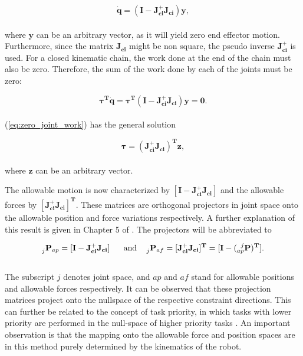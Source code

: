 \begin{equation}
    \mathbf{\dot{q} = (I - J_{ci}^+ J_{ci}) y},
\end{equation}
\\
where $\mathbf{y}$ can be an arbitrary vector, as it will yield zero end effector motion. Furthermore, since the matrix $\mathbf{J_{ci}}$ might be non square, the pseudo inverse $\mathbf{J_{ci}^+}$ is used.
For a closed kinematic chain, the work done at the end of the chain must also be zero. Therefore, the sum of the work done by each of the joints must be zero:

\begin{equation} \label{eq:zero_joint_work}
    \boldsymbol{\tau^T} \mathbf{\dot{q}} = \boldsymbol{\tau^T} \mathbf{(I - J_{ci}^+ J_{ci}) y = 0}.
\end{equation}
\\
(\ref{eq:zero_joint_work}) has the general solution

\begin{equation}
   \boldsymbol{\tau}  \mathbf{= (J_{ci}^+ J_{ci})^T z},
\end{equation}
\\
where $\mathbf{z}$ can be an arbitrary vector.

The allowable motion is now characterized by $\mathbf{[I - J_{ci}^+ J_{ci}]}$ and the allowable forces by $\mathbf{[J_{ci}^+ J_{ci}]^T}$. These matrices are orthogonal projectors in joint space onto the allowable position and force variations respectively. A further explanation of this result is given in Chapter 5 of \cite{west1985method}. The projectors will be abbreviated to

\begin{equation}\label{eq:proj_mtrices}
    \prescript{}{j}{\mathbf{P}}_{ap} = \mathbf{[I - J_{ci}^+ J_{ci}]} \ \ \quad \textrm{and} \quad
    \prescript{}{j}{\mathbf{P}}_{af} = \mathbf{[J_{ci}^+ J_{ci}]^T = [I - (\prescript{j}{ap}{P})^T]}.
\end{equation}
\\
The subscript $j$ denotes joint space, and $ap$ and $af$ stand for allowable positions and allowable forces respectively. It can be observed that these projection matrices project onto the nullspace of the respective constraint directions. This can further be related to the concept of task priority, in which tasks with lower priority are performed in the null-space of higher priority tasks \cite{chiaverini2008kinematically}. An important observation is that the mapping onto the allowable force and position spaces are in this method purely determined by the kinematics of the robot.

